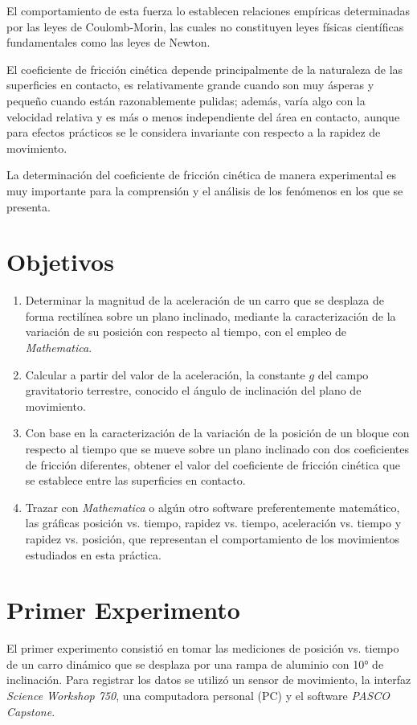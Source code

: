\documentclass[12pt, titlepage]{report}
\begin{document}
    El comportamiento de esta fuerza lo establecen relaciones empíricas determinadas por las leyes de Coulomb-Morin, las cuales no constituyen leyes físicas científicas fundamentales como las leyes de Newton.

    El coeficiente de fricción cinética depende principalmente de la naturaleza de las superficies en contacto, es relativamente grande cuando son muy ásperas y pequeño cuando están razonablemente pulidas; además, varía algo con la velocidad relativa y es más o menos independiente del área en contacto, aunque para efectos prácticos se le considera invariante con respecto a la rapidez de movimiento.

    La determinación del coeficiente de fricción cinética de manera experimental es muy importante para la comprensión y el análisis de los fenómenos en los que se presenta. 

    \section*{Objetivos}
    \begin{enumerate}
        \item Determinar la magnitud de la aceleración de un carro que se desplaza de forma rectilínea sobre un plano inclinado, mediante la caracterización de la variación de su posición con respecto al tiempo, con el empleo de \textit{Mathematica}. 
        \item Calcular a partir del valor de la aceleración, la constante $g$ del campo gravitatorio terrestre, conocido el ángulo de inclinación del plano de movimiento. 
        \item Con base en la caracterización de la variación de la posición de un bloque con respecto al tiempo que se mueve sobre un plano inclinado con dos coeficientes de fricción diferentes, obtener el valor del coeficiente de fricción cinética que se establece entre las superficies en contacto. 
        \item Trazar con \textit{Mathematica} o algún otro software preferentemente matemático, las gráficas posición vs. tiempo, rapidez vs. tiempo, aceleración vs. tiempo y rapidez vs. posición, que representan el comportamiento de los movimientos estudiados en esta práctica. 
    \end{enumerate}

    \section*{Primer Experimento}
    El primer experimento consistió en tomar las mediciones de posición vs. tiempo de un carro dinámico que se desplaza por una rampa de aluminio con 10° de inclinación. Para registrar los datos se utilizó un sensor de movimiento, la interfaz \textit{Science Workshop 750}, una computadora personal (PC) y el software \textit{PASCO Capstone}.
\end{document}
